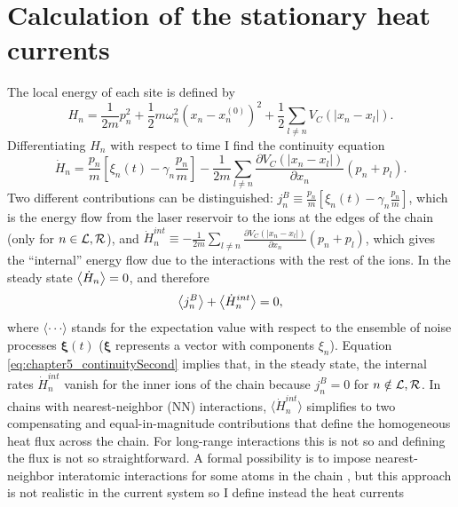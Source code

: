 \section{Calculation of the stationary heat currents\label{sec:chapter5_HeatFlow}}
%
%
The local energy of each site is defined by
%
\begin{equation}
    H_n = \frac{1}{2m} p_n^2 + \frac{1}{2}m\omega_n^2 \left( x_n - x_n^{(0)}\right)^2 +\frac{1}{2}\sum_{l\neq n} V_C(\left|x_n-x_l\right|).
    \label{eq:chapter5_LocalEnergy}
\end{equation}
%
Differentiating $H_n$ with respect to time I find the continuity  equation
%
\begin{equation}
    \dot{H}_n = \frac{p_n}{m}\! \left[ \xi_n(t)-\gamma_n \frac{p_n}{m} \right]\! - \frac{1}{2m}\!\sum_{l\neq n}\frac{\partial V_C (\left|x_n\!-\!x_l\right|)}{\partial x_n}(p_n + p_l).
    \label{eq:chapter5_continuityFirst}
\end{equation}
%
Two different contributions can be distinguished: $j^B_n \equiv \frac{p_n}{m} \left[ \xi_n(t)-\gamma_n \frac{p_n}{m} \right]$, which is the energy flow from the laser reservoir to the ions at the edges of the chain (only for $n\in {\cal L}, {\cal R}$), and $\dot{H}_n^{int} \equiv - \frac{1}{2m}\sum_{l\neq n}\frac{\partial V_C (\left|x_n-x_l\right|)}{\partial x_n}(p_n + p_l)$, which gives the ``internal'' energy flow due to the interactions with the rest of the ions. In the steady state $\expval{\dot{H}_n} = 0$, and therefore
%
\begin{equation}
    \expval{j^B_n} + \expval{\dot{H}_n^{int}} = 0,
    \label{eq:chapter5_continuitySecond}
\end{equation}
%
where $\langle \cdot\!\cdot\!\cdot \rangle$ stands for the expectation value with respect to  the ensemble of noise processes $\bm\xi (t)$ ($\bm\xi$ represents a vector with
components $\xi_n$). Equation \eqref{eq:chapter5_continuitySecond} implies that, in the steady state, the internal rates $\dot{H}_n^{int}$ vanish for the inner ions of the chain because $j^B_n = 0$ for $n\notin {\cal L},{\cal R}$. In chains with nearest-neighbor (NN) interactions,
$\langle\dot{H}_n^{int}\rangle$ simplifies to two compensating and equal-in-magnitude contributions that define the homogeneous heat flux across the chain.
For long-range interactions this is not so and defining the flux is not so straightforward. A formal possibility is to impose
nearest-neighbor interatomic interactions for some atoms in the chain \cite{Chen2015},
but this approach is not realistic in the current system so I define instead the heat currents
